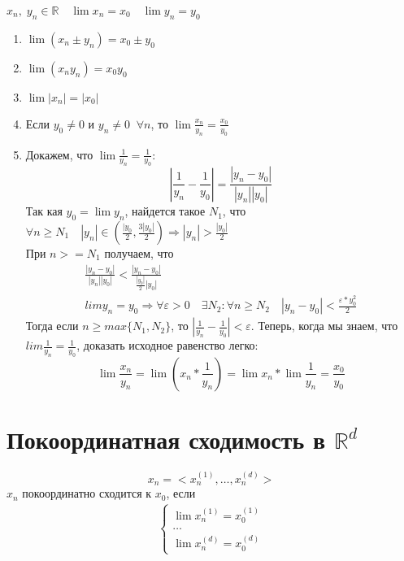 \documentclass[12pt,letterpaper]{report}
\makeatletter
\renewenvironment{proof}[1][\proofname]{%
   \par\pushQED{\qed}\normalfont%
   \topsep6\p@\@plus6\p@\relax
   \trivlist\item[\hskip\labelsep\bfseries#1\@addpunct{.}]%
   \ignorespaces
}{%
   \popQED\endtrivlist\@endpefalse
}
\makeatother
\begin{document}
$x_n,\; y_n \in \mathbb{R} \quad \lim x_n = x_0 \quad \lim y_n = y_0$
\begin{enumerate}
    \item $\lim (x_n \pm y_n) = x_0 \pm y_0$
    \item $\lim (x_ny_n) = x_0y_0$
    \item $\lim |x_n| = |x_0|$
    \item Если $y_0 \neq 0$ и $y_n \neq 0\;\; \forall n$, то $\lim \frac{x_n}{y_n} = \frac{x_0}{y_0}$
    \begin{proof}
        Докажем, что $\lim\frac{1}{y_n} = \frac{1}{y_0}$:
        \[ | \frac{1}{y_n} - \frac{1}{y_0} | = \frac{|y_n - y_0|}{|y_n||y_0|} \]
        Так кая $y_0 = \lim y_n$, найдется такое $N_1$, что $\forall n \geqslant N_1 \quad |y_n| \in (\frac{|y_0}{2}, \frac{3|y_0|}{2}) \Rightarrow |y_n| > \frac{|y_0|}{2}$ \\
        При $n >= N_1$ получаем, что
        \begin{gather*}
            \frac{|y_n - y_0|}{|y_n||y_0|} < \frac{|y_n - y_0|}{\frac{|y_0|}{2}|y_0|} \\
            lim y_n = y_0 \Rightarrow \forall \varepsilon > 0 \quad \exists N_2 : \forall n \geqslant N_2 \quad |y_n - y_0| < \frac{\varepsilon*y_0^2}{2}
        \end{gather*}
        Тогда если $n \geqslant max\{N_1, N_2\}$, то $|\frac{1}{y_n} - \frac{1}{y_0}| < \varepsilon$.
        Теперь, когда мы знаем, что $lim\frac{1}{y_n} = \frac{1}{y_0}$, доказать исходное равенство легко:
        \[ \lim \frac{x_n}{y_n} = \lim (x_n * \frac{1}{y_n}) = \lim x_n * \lim \frac{1}{y_n} = \frac{x_0}{y_0} \]
    \end{proof}
\end{enumerate}

\section{Покоординатная сходимость в $\mathbb{R}^d$}
\[ x_n = <x_n^{(1)}, \dots, x_n^{(d)}> \]
$x_n$ покоординатно сходится к $x_0$, если \\
\begin{gather*}
    \begin{cases}
        \lim x_n^{(1)} = x_0^{(1)} \\
        \dots \\
        \lim x_n^{(d)} = x_0^{(d)}
    \end{cases}
\end{gather*}
\end{document}
